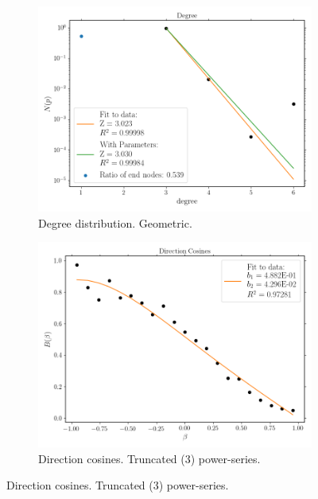 \begin{figure}[H]
  \centering
  \begin{subfigure}{0.5\textwidth}
    \centering
    \includegraphics[width=0.99\linewidth]{Figures/chapter-image/pipeline_screenshots/carra_degree_tile1_c_m.png}
    \caption{Degree distribution. Geometric.}
    \label{subfig:carra_degree}
  \end{subfigure}%
  \begin{subfigure}{0.5\textwidth}
    \centering
    \includegraphics[width=0.99\linewidth]{Figures/chapter-image/pipeline_screenshots/carra_cosines_tile1_c_m_iPA_iShort2_bins21.png}
    \caption{Direction cosines. Truncated (3) power-series.}

\end{subfigure}
\end{figure}
